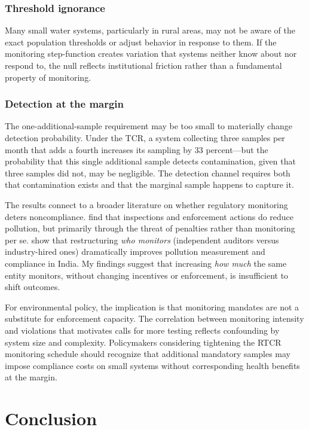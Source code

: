 \documentclass[12pt]{article}
\begin{document}
\subsubsection*{Threshold ignorance} Many small water systems, particularly in rural areas, may not be aware of the exact population thresholds or adjust behavior in response to them. If the monitoring step-function creates variation that systems neither know about nor respond to, the null reflects institutional friction rather than a fundamental property of monitoring.

\subsubsection*{Detection at the margin} The one-additional-sample requirement may be too small to materially change detection probability. Under the TCR, a system collecting three samples per month that adds a fourth increases its sampling by 33 percent---but the probability that this single additional sample detects contamination, given that three samples did not, may be negligible. The detection channel requires both that contamination exists and that the marginal sample happens to capture it.

The results connect to a broader literature on whether regulatory monitoring deters noncompliance. \citet{gray2011effectiveness} find that inspections and enforcement actions do reduce pollution, but primarily through the threat of penalties rather than monitoring per se. \citet{duflo2013truth} show that restructuring \textit{who monitors} (independent auditors versus industry-hired ones) dramatically improves pollution measurement and compliance in India. My findings suggest that increasing \textit{how much} the same entity monitors, without changing incentives or enforcement, is insufficient to shift outcomes.

For environmental policy, the implication is that monitoring mandates are not a substitute for enforcement capacity. The correlation between monitoring intensity and violations that motivates calls for more testing reflects confounding by system size and complexity. Policymakers considering tightening the RTCR monitoring schedule should recognize that additional mandatory samples may impose compliance costs on small systems without corresponding health benefits at the margin.


\section{Conclusion}
\end{document}
